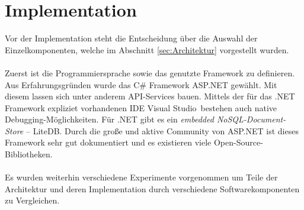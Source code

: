 \section{Implementation} \label{sec:Implementation}
    Vor der Implementation steht die Entscheidung über die Auswahl der Einzelkomponenten, welche im Abschnitt \ref{sec:Architektur} vorgestellt wurden.
    \\ \\
    Zuerst ist die Programmiersprache sowie das genutzte Framework zu definieren.
    Aus Erfahrungsgründen wurde das C\# Framework ASP.NET gewählt.
    Mit diesem lassen sich unter anderem API-Services bauen.
    Mittels der für das .NET Framework expliziet vorhandenen IDE \glqq Visual Studio\grqq~bestehen auch native Debugging-Möglichkeiten.
    Für .NET gibt es ein \textit{embedded NoSQL-Document-Store} -- LiteDB. %
    Durch die große und aktive Community von ASP.NET ist dieses Framework sehr gut dokumentiert und es existieren viele Open-Source-Bibliotheken.
    \\ \\
    Es wurden weiterhin verschiedene Experimente vorgenommen um Teile der Architektur und deren Implementation durch verschiedene Softwarekomponenten zu Vergleichen.
    
